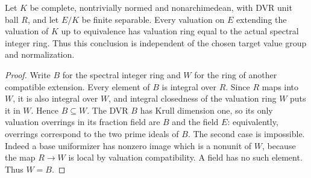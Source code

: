 \begin{lemma}
\label{fw:spectral-valuation-ring-unique}
\leanok
Let $K$ be complete, nontrivially normed and nonarchimedean, with DVR
unit ball $R$, and let $E/K$ be finite separable. Every valuation on
$E$ extending the valuation of $K$ up to equivalence has valuation ring
equal to the actual spectral integer ring. Thus this conclusion is
independent of the chosen target value group and normalization.
\end{lemma}
\begin{proof}
Write $B$ for the spectral integer ring and $W$ for the ring of another
compatible extension. Every element of $B$ is integral over $R$.
Since $R$ maps into $W$, it is also integral over $W$, and integral
closedness of the valuation ring $W$ puts it in $W$. Hence $B\subseteq W$.
The DVR $B$ has Krull dimension one, so its only valuation overrings
in its fraction field are $B$ and the field $E$: equivalently, overrings
correspond to the two prime ideals of $B$. The second case is impossible.
Indeed a base uniformizer has nonzero image which is a nonunit of $W$,
because the map $R\to W$ is local by valuation compatibility. A field
has no such element. Thus $W=B$.
\end{proof}

